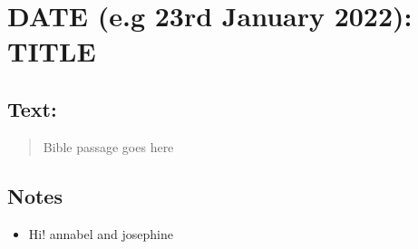 \section{DATE (e.g 23rd January 2022): TITLE}
\subsection*{Text: }
  \begin{quote}
    Bible passage goes here
  \end{quote}
\subsection*{Notes}
\begin{itemize}
  \item{Hi! annabel and josephine}
\end{itemize}